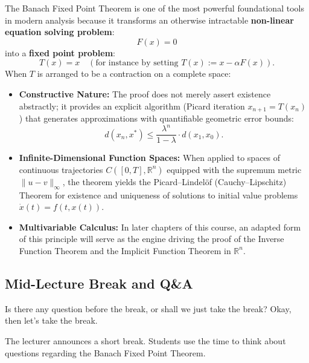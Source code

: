 \begin{insight}
The Banach Fixed Point Theorem is one of the most powerful foundational tools in modern analysis because it transforms an otherwise intractable \textbf{non-linear equation solving problem}:
\[
F(x) = 0
\]
into a \textbf{fixed point problem}:
\[
T(x) = x \quad (\text{for instance by setting } T(x) := x - \alpha F(x)).
\]
When $T$ is arranged to be a contraction on a complete space:
\begin{itemize}
    \item \textbf{Constructive Nature:} The proof does not merely assert existence abstractly; it provides an explicit algorithm (Picard iteration $x_{n+1} = T(x_n)$) that generates approximations with quantifiable geometric error bounds:
    \[
    d(x_n, x^*) \le \frac{\lambda^n}{1 - \lambda} \cdot d(x_1, x_0).
    \]
    \item \textbf{Infinite-Dimensional Function Spaces:} When applied to spaces of continuous trajectories $C([0, T], \mathbb{R}^n)$ equipped with the supremum metric $\|u - v\|_\infty$, the theorem yields the Picard--Lindelöf (Cauchy--Lipschitz) Theorem for existence and uniqueness of solutions to initial value problems $\dot{x}(t) = f(t, x(t))$.
    \item \textbf{Multivariable Calculus:} In later chapters of this course, an adapted form of this principle will serve as the engine driving the proof of the Inverse Function Theorem and the Implicit Function Theorem in $\mathbb{R}^n$.
\end{itemize}
\end{insight}

\subsection{Mid-Lecture Break and Q\&A}

\begin{speech}[00:44:24 - 00:44:32]
Is there any question before the break, or shall we just take the break? Okay, then let's take the break. 
\end{speech}

\begin{pause}
The lecturer announces a short break. Students use the time to think about questions regarding the Banach Fixed Point Theorem.
\end{pause}

